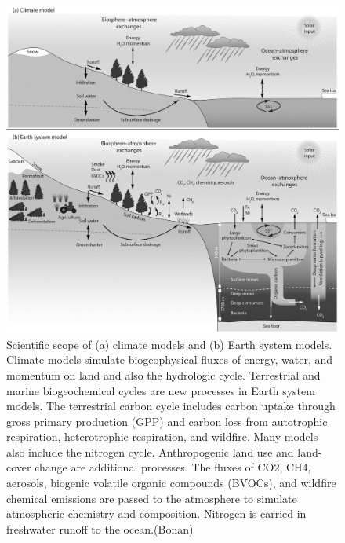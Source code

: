 \documentclass[12pt,oneside]{book}
\begin{document}
\begin{figure}

{\centering \includegraphics[width=0.8\linewidth]{figures/chap9/f93_ESM_bonan} 

}

\caption{Scientific scope of (a) climate models and (b) Earth system models. Climate models simulate biogeophysical fluxes of energy, water, and momentum on land and also the hydrologic cycle. Terrestrial and marine biogeochemical cycles are new processes in Earth system models. The terrestrial carbon cycle includes carbon uptake through gross primary production (GPP) and carbon loss from autotrophic respiration, heterotrophic respiration, and wildfire. Many models also include the nitrogen cycle. Anthropogenic land use and land-cover change are additional processes. The fluxes of CO2, CH4, aerosols, biogenic volatile organic compounds (BVOCs), and wildfire chemical emissions are passed to the atmosphere to simulate atmospheric chemistry and composition. Nitrogen is carried in freshwater runoff to the ocean.(Bonan)}\label{fig:f93}
\end{figure}
\end{document}
